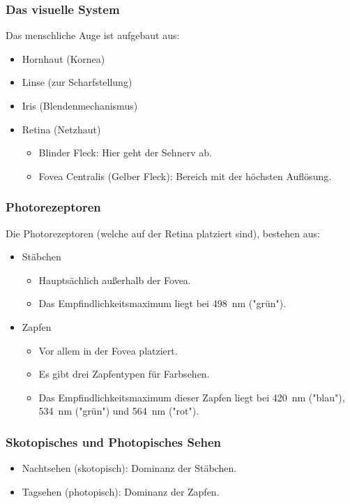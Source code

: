 \documentclass[a4paper, 11pt, accentcolor = tud3b]{tudreport}
\begin{document}
				\subsubsection{Das visuelle System}
					Das menschliche Auge ist aufgebaut aus:
					\begin{itemize}
						\item Hornhaut (Kornea)
						\item Linse (zur Scharfstellung)
						\item Iris (Blendenmechanismus)
						\item Retina (Netzhaut)
							\begin{itemize}
								\item Blinder Fleck: Hier geht der Sehnerv ab.
								\item Fovea Centralis (Gelber Fleck): Bereich mit der höchsten Auflösung.
							\end{itemize}
					\end{itemize}

				\subsubsection{Photorezeptoren}
					Die Photorezeptoren (welche auf der Retina platziert sind), bestehen aus:
					\begin{itemize}
						\item Stäbchen
							\begin{itemize}
								\item Hauptsächlich außerhalb der Fovea.
								\item Das Empfindlichkeitsmaximum liegt bei \SI{498}{\nano\meter} ("grün").
							\end{itemize}
						\item Zapfen
							\begin{itemize}
								\item Vor allem in der Fovea platziert.
								\item Es gibt drei Zapfentypen für Farbsehen.
								\item Das Empfindlichkeitsmaximum dieser Zapfen liegt bei \SI{420}{\nano\meter} ("blau"), \SI{534}{\nano\meter} ("grün") und \SI{564}{\nano\meter} ("rot").
							\end{itemize}
					\end{itemize}

				\subsubsection{Skotopisches und Photopisches Sehen}
					\begin{itemize}
						\item Nachtsehen (skotopisch): Dominanz der Stäbchen.
						\item Tagsehen (photopisch): Dominanz der Zapfen.
					\end{itemize}
\end{document}

